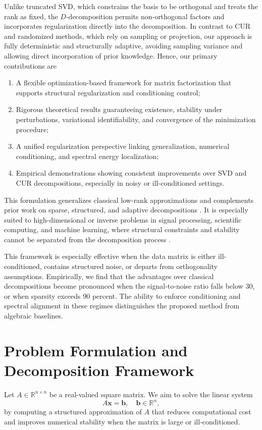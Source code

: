 \documentclass[10pt,a4paper]{article}
\begin{document}
Unlike truncated SVD, which constrains the basis to be orthogonal and treats the rank as fixed, the \( D \)-decomposition permits non-orthogonal factors and incorporates regularization directly into the decomposition. In contrast to CUR and randomized methods, which rely on sampling or projection, our approach is fully deterministic and structurally adaptive, avoiding sampling variance and allowing direct incorporation of prior knowledge. Hence, our primary contributions are
\begin{enumerate}
    \item A flexible optimization-based framework for matrix factorization that supports structural regularization and conditioning control;
    \item Rigorous theoretical results guaranteeing existence, stability under perturbations, variational identifiability, and convergence of the minimization procedure;
    \item A unified regularization perspective linking generalization, numerical conditioning, and spectral energy localization;
    \item Empirical demonstrations showing consistent improvements over SVD and CUR decompositions, especially in noisy or ill-conditioned settings.
\end{enumerate}This formulation generalizes classical low-rank approximations and complements prior work on sparse, structured, and adaptive decompositions \cite{mat20, mat23, mat24, mat27}. It is especially suited to high-dimensional or inverse problems in signal processing, scientific computing, and machine learning, where structural constraints and stability cannot be separated from the decomposition process \cite{mat30}.

This framework is especially effective when the data matrix is either ill-conditioned, contains structured noise, or departs from orthogonality assumptions. Empirically, we find that the advantages over classical decompositions become pronounced when the signal-to-noise ratio falls below 30, or when sparsity exceeds 90 percent. The ability to enforce conditioning and spectral alignment in these regimes distinguishes the proposed method from algebraic baselines.


\section{Problem Formulation and Decomposition Framework}

Let \( A \in \mathbb{R}^{n \times n} \) be a real-valued square matrix. We aim to solve the linear system
\[
A \mathbf{x} = \mathbf{b}, \quad \mathbf{b} \in \mathbb{R}^n,
\]
by computing a structured approximation of \( A \) that reduces computational cost and improves numerical stability when the matrix is large or ill-conditioned.
\end{document}
